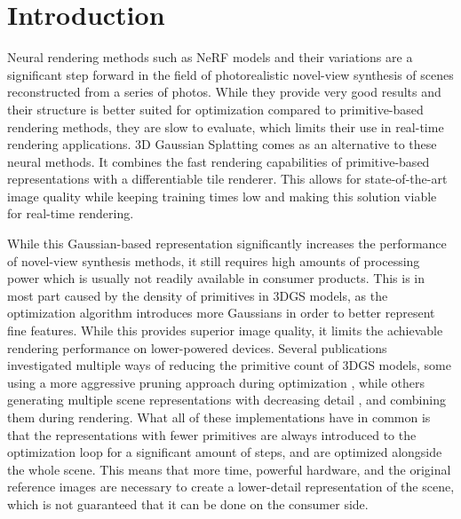 \section{Introduction}
Neural rendering methods such as NeRF models and their variations \cite{mildenhall2020nerf, barron2021mipnerf, barron2022mipnerf360, garbin2021fastnerf} are a significant step forward in the field of photorealistic novel-view synthesis of scenes reconstructed from a series of photos. While they provide very good results and their structure is better suited for optimization compared to primitive-based rendering methods, they are slow to evaluate, which limits their use in real-time rendering applications. 3D Gaussian Splatting \cite{kerbl3Dgaussians} comes as an alternative to these neural methods. It combines the fast rendering capabilities of primitive-based representations with a differentiable tile renderer. This allows for state-of-the-art image quality while keeping training times low and making this solution viable for real-time rendering. 

While this Gaussian-based representation significantly increases the performance of novel-view synthesis methods, it still requires high amounts of processing power which is usually not readily available in consumer products. This is in most part caused by the density of primitives in 3DGS models, as the optimization algorithm introduces more Gaussians in order to better represent fine features. While this provides superior image quality, it limits the achievable rendering performance on lower-powered devices. Several publications investigated multiple ways of reducing the primitive count of 3DGS models, some using a more aggressive pruning approach during optimization \cite{fan2023lightgaussian}, while others generating multiple scene representations with decreasing detail \cite{kerbl_hierarchy, liu2024citygaussian, ren2024octreegs}, and combining them during rendering. What all of these implementations have in common is that the representations with fewer primitives are always introduced to the optimization loop for a significant amount of steps, and are optimized alongside the whole scene. This means that more time, powerful hardware, and the original reference images are necessary to create a lower-detail representation of the scene, which is not guaranteed that it can be done on the consumer side.


